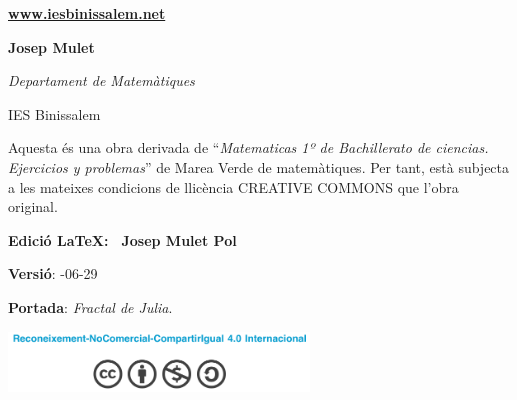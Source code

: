 \begin{center}
\begin{minipage}{0.4\textwidth}
\begin{center}
			\small
			
			\noindent \href{www.iesbinissalem.net}{\textbf{www.iesbinissalem.net}}  
			
		\end{center}
	\end{minipage}
	\begin{minipage}{0.4\textwidth}
		\begin{flushright}
			\textbf{Josep Mulet}
			
			\textit{Departament de Matemàtiques} 
			
			IES Binissalem
		\end{flushright}
	\end{minipage} 
	
	
\end{center}

\newpage

\vspace*{12.9cm}
\begin{center}
	\begin{minipage}{0.5\textwidth}
		Aquesta és una obra derivada de ``\textit{Matematicas 1º de Bachillerato de ciencias. Ejercicios y problemas}'' de Marea Verde de matemàtiques. Per tant, està subjecta a les mateixes condicions de llicència CREATIVE COMMONS que l'obra original.
		
		\noindent \textbf{Edició \LaTeX: \quad \textregistered \,  Josep Mulet Pol}
		
		\noindent \textbf{Versió}: -06-29
		
		\noindent \textbf{Portada}: \quad \textit{Fractal de Julia}.
		
		
		\begin{center}
			\includegraphics*[width=8cm]{img-00/licencia}
		\end{center}
	\end{minipage}
\end{center}



\newpage


\renewcommand{\thepage}{\Roman{page}}%
\pagestyle{myheadings}
\thispagestyle{empty}
\renewcommand{\headrulewidth}{0pt}
\renewcommand{\footrulewidth}{0pt}


